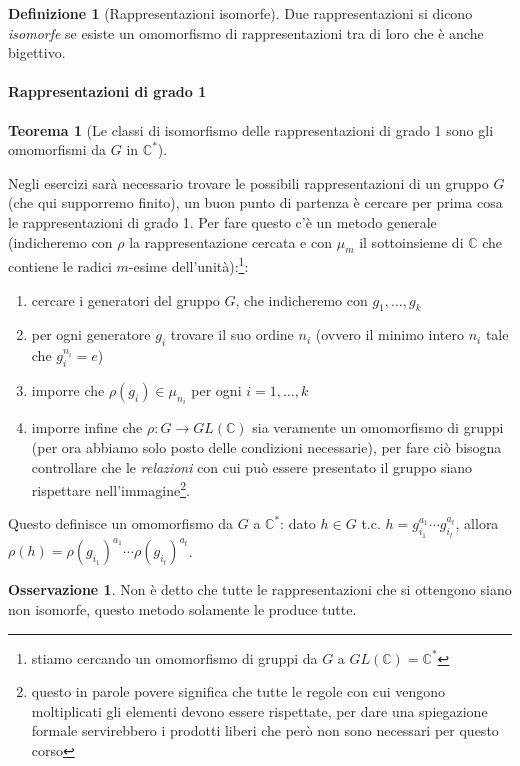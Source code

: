 \documentclass[11pt]{article}
\theoremstyle{plain}
\newtheorem{thm}{Teorema}[section]
\theoremstyle{definition}
\newtheorem{defn}{Definizione}[section]
\newtheorem*{rem}{Osservazione}
\theoremstyle{remark}
\newcommand{\C}{\mathbb{C}}
\begin{document}
\begin{defn}[Rappresentazioni isomorfe]
Due rappresentazioni si dicono \textit{isomorfe} se esiste un omomorfismo di rappresentazioni tra di loro che è anche bigettivo.
\end{defn}




\paragraph{Rappresentazioni di grado 1}
\begin{thm}[Le classi di isomorfismo delle rappresentazioni di grado 1 sono gli omomorfismi da $G$ in $\C^*$]
\end{thm}
Negli esercizi sarà necessario trovare le possibili rappresentazioni di un gruppo $G$ (che qui supporremo finito), un buon punto di partenza è cercare per prima cosa le rappresentazioni di grado 1. Per fare questo c'è un metodo generale (indicheremo con $\rho$ la rappresentazione cercata e con $\mu_m$ il sottoinsieme di $\C$ che contiene le radici $m$-esime dell'unità):\footnote{stiamo cercando un omomorfismo di gruppi da $G$ a $GL(\C)=\C^*$}:
\begin{enumerate}
	\item cercare i generatori del gruppo $G$, che indicheremo con $g_1, \ldots, g_k$
	\item per ogni generatore $g_i$ trovare il suo ordine $n_i$ (ovvero il minimo intero $n_i$ tale che $g_i^{n_i}=e$)
	\item imporre che $\rho(g_i)\in \mu_{n_i}$ per ogni $i=1,\ldots,k$
	\item imporre infine che $\rho:G\to GL(\C)$ sia veramente un omomorfismo di gruppi (per ora abbiamo solo posto delle condizioni necessarie), per fare ciò bisogna controllare che le \textit{relazioni} con cui può essere presentato il gruppo siano rispettare nell'immagine\footnote{questo in parole povere significa che tutte le regole con cui vengono moltiplicati gli elementi devono essere rispettate, per dare una spiegazione formale servirebbero i prodotti liberi che però non sono necessari per questo corso}.
\end{enumerate}
Questo definisce un omomorfismo da $G$ a $\C^*$: dato $h\in G$ t.c. $h=g_{i_1}^{a_1}\cdots g_{i_t}^{a_t}$, allora $\rho(h) = \rho(g_{i_1})^{a_1}\cdots \rho(g_{i_t})^{a_t}$.
\begin{rem}
	Non è detto che tutte le rappresentazioni che si ottengono siano non isomorfe, questo metodo solamente le produce tutte.
\end{rem}
\end{document}
